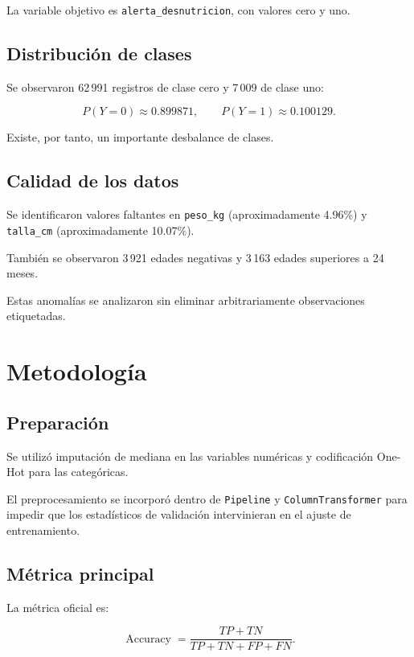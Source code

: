 ﻿\documentclass[11pt,a4paper]{article}
\begin{document}
La variable objetivo es
\texttt{alerta\_desnutricion}, con valores cero y uno.

\subsection{Distribución de clases}

Se observaron 62\,991 registros de clase cero
y 7\,009 de clase uno:

\[
P(Y=0)\approx0.899871,
\qquad
P(Y=1)\approx0.100129.
\]

Existe, por tanto, un importante desbalance de clases.

\subsection{Calidad de los datos}

Se identificaron valores faltantes en
\texttt{peso\_kg} (aproximadamente 4.96\%) y
\texttt{talla\_cm} (aproximadamente 10.07\%).

También se observaron 3\,921 edades negativas
y 3\,163 edades superiores a 24 meses.

Estas anomalías se analizaron sin eliminar
arbitrariamente observaciones etiquetadas.

\section{Metodología}

\subsection{Preparación}

Se utilizó imputación de mediana en las variables
numéricas y codificación One-Hot para las categóricas.

El preprocesamiento se incorporó dentro de
\texttt{Pipeline} y \texttt{ColumnTransformer}
para impedir que los estadísticos de validación
intervinieran en el ajuste de entrenamiento.

\subsection{Métrica principal}

La métrica oficial es:

\[
\operatorname{Accuracy}
=
\frac{TP+TN}{TP+TN+FP+FN}.
\]
\end{document}
